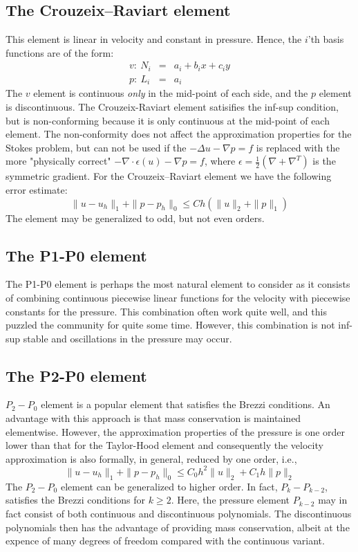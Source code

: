 \subsection{The Crouzeix--Raviart element}
This element is linear in velocity and constant in pressure. Hence, the $i$'th basis functions are of the form:
\begin{eqnarray*}
v:\ N_i &=& a_i + b_i x + c_i y\\
p:\ L_i &=& a_i
\end{eqnarray*}
The $v$ element is continuous \emph{only} in the mid-point of each side, and the $p$ element is discontinuous. The Crouzeix-Raviart element satisifies 
the inf-sup condition, but is non-conforming because it is only continuous at the mid-point of each element. The non-conformity 
does not affect the approximation properties for the Stokes problem, but can not be used if the 
$-\Delta u - \nabla p = f$  
is replaced with the more "physically correct"  
$-\nabla \cdot \epsilon(u) - \nabla p = f$, where $\epsilon=\frac{1}{2}(\nabla + \nabla^T)$ is the symmetric gradient.  
For the Crouzeix--Raviart element we have the following error estimate:
\[\|u-u_h\|_1 + \|p-p_h\|_0 \le Ch (\|u\|_{2} + \|p\|_{1})\]
The element may be generalized to odd, but not even orders. 


\subsection{The P1-P0 element}

The P1-P0 element is perhaps the most natural element to consider as it consists of combining continuous piecewise linear functions for the velocity with piecewise constants
for the pressure. This combination often work quite well, and this puzzled the community for quite some time. However, this combination is not inf-sup stable 
and oscillations in the pressure may occur.


\subsection{The P2-P0 element}

$P_2-P_0$ element is a popular element that  satisfies the Brezzi conditions. 
An advantage with this approach is that mass conservation is
maintained elementwise. However, the approximation properties of the pressure is one order lower than that for the Taylor-Hood element
and consequently the velocity approximation is also formally, in general,  reduced by one order, i.e.,  
\[\|u-u_h\|_1 + \|p-p_h\|_0 \le C_0 h^2\|u\|_{2} + C_1 h\|p\|_{2}\]
The $P_2-P_0$ element can be generalized to higher order. 
In fact,  $P_k-P_{k-2}$, satisfies the Brezzi conditions for $k\ge 2$. Here, the pressure element $P_{k-2}$
may in fact consist of both continuous and discontinuous polynomials. 
The discontinuous polynomials then has the advantage of providing 
mass conservation, albeit at the expence of many degrees of freedom 
compared with the continuous variant. 



